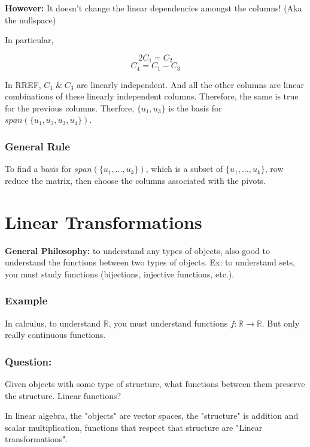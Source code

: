 \documentclass{article}
\newtheorem{one minute paper}[theorem]{One Minute Paper}
\begin{document}
\textbf{However:} It doesn't change the linear dependencies amongst the columns! (Aka the nullspace)

In particular, 

\begin{equation}
    2C_1 = C_2
\end{equation}
\begin{equation}
    C_4 = C_1 - C_3
\end{equation}

In RREF, $C_1 \; \& \; C_3$ are linearly independent. And all the other columns are linear combinations of these linearly independent columns. Therefore, the same is true for the previous columns. 
Therfore, $\{u_1,u_3\}$ is the basis for $span(\{u_1,u_2,u_3,u_4\})$. 

\subsubsection*{General Rule}

To find a basis for $span(\{u_1,\dots, u_k\})$, which is a subset of $\{u_1, \dots, u_k\}$, row reduce the matrix, then choose the columns associated with the pivots. 

\section*{Linear Transformations}

\textbf{General Philosophy:} to understand any types of objects, also good to understand the functions between two types of objects. Ex:
to understand sets, you must study functions (bijections, injective functions, etc.). 

\subsubsection*{Example}

In calculus, to understand $\mathbb{R}$, you must understand functions $f: \mathbb{R} \rightarrow \mathbb{R}$. But only really continuous functions. 

\subsubsection*{Question:} Given objects with some type of structure, what functions between them preserve the structure. Linear functions? 

In linear algebra, the "objects" are vector spaces, the "structure" is addition and scalar multiplication, functions that respect that structure are "Linear transformations".
\end{document}
